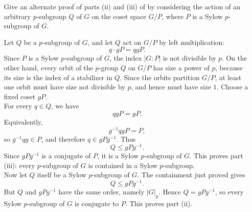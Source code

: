 \documentclass[../Odyssey_Project.tex]{subfiles}
\begin{document}
\begin{exercise}
\label{ex:7.3}
Give an alternate proof of parts (ii) and (iii) of  by considering the action of an arbitrary $p$-subgroup $Q$ of $G$ on the coset space $G/P$, where $P$ is a Sylow $p$-subgroup of $G$.
\end{exercise}
\begin{solution}
Let $Q$ be a $p$-subgroup of $G$, and let $Q$ act on $G/P$ by left multiplication:
\[
    q\cdot gP=qgP.
\]
Since $P$ is a Sylow $p$-subgroup of $G$, the index $|G:P|$ is not divisible by $p$. On the other hand, every orbit of the $p$-group $Q$ on $G/P$ has size a power of $p$, because its size is the index of a stabilizer in $Q$. Since the orbits partition $G/P$, at least one orbit must have size not divisible by $p$, and hence must have size $1$. Choose a fixed coset $gP$.\\
For every $q\in Q$, we have
\[
    qgP=gP.
\]
Equivalently,
\[
    g^{-1}qgP=P,
\]
so $g^{-1}qg\in P$, and therefore $q\in gPg^{-1}$. Thus
\[
    Q\leq gPg^{-1}.
\]
Since $gPg^{-1}$ is a conjugate of $P$, it is a Sylow $p$-subgroup of $G$. This proves part (iii): every $p$-subgroup of $G$ is contained in a Sylow $p$-subgroup.\\
Now let $Q$ itself be a Sylow $p$-subgroup of $G$. The containment just proved gives
\[
    Q\leq gPg^{-1}.
\]
But $Q$ and $gPg^{-1}$ have the same order, namely $|G|_p$. Hence $Q=gPg^{-1}$, so every Sylow $p$-subgroup of $G$ is conjugate to $P$. This proves part (ii).
\end{solution}
\end{document}
